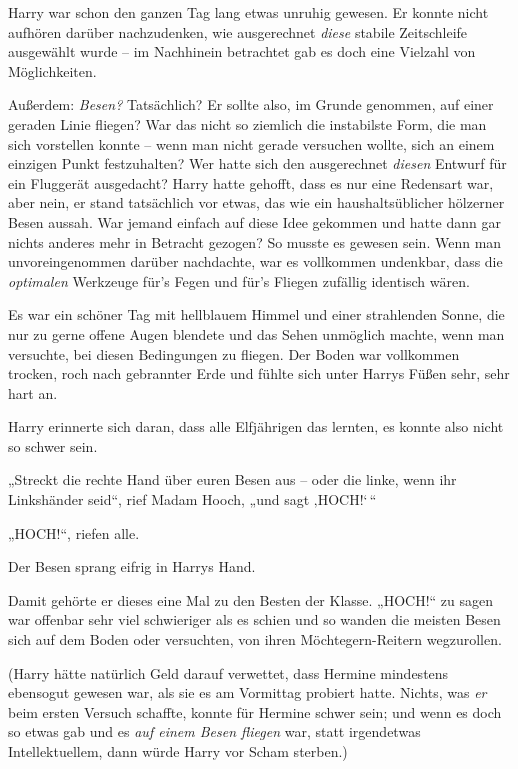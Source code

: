 {Harry war schon den ganzen Tag lang etwas unruhig gewesen. Er konnte nicht aufhören darüber nachzudenken, wie ausgerechnet \emph{diese} stabile Zeitschleife ausgewählt wurde -- im Nachhinein betrachtet gab es doch eine Vielzahl von Möglichkeiten.

Außerdem: \emph{Besen?} Tatsächlich? Er sollte also, im Grunde genommen, auf einer geraden Linie fliegen? War das nicht so ziemlich die instabilste Form, die man sich vorstellen konnte -- wenn man nicht gerade versuchen wollte, sich an einem einzigen Punkt festzuhalten? Wer hatte sich den ausgerechnet \emph{diesen} Entwurf für ein Fluggerät ausgedacht? Harry hatte gehofft, dass es nur eine Redensart war, aber nein, er stand tatsächlich vor etwas, das wie ein haushaltsüblicher hölzerner Besen aussah. War jemand einfach auf diese Idee gekommen und hatte dann gar nichts anderes mehr in Betracht gezogen? So musste es gewesen sein. Wenn man unvoreingenommen darüber nachdachte, war es vollkommen undenkbar, dass die \emph{optimalen} Werkzeuge für's Fegen und für's Fliegen zufällig identisch wären.

Es war ein schöner Tag mit hellblauem Himmel und einer strahlenden Sonne, die nur zu gerne offene Augen blendete und das Sehen unmöglich machte, wenn man versuchte, bei diesen Bedingungen zu fliegen. Der Boden war vollkommen trocken, roch nach gebrannter Erde und fühlte sich unter Harrys Füßen sehr, sehr hart an.

Harry erinnerte sich daran, dass alle Elfjährigen das lernten, es konnte also nicht so schwer sein.

„Streckt die rechte Hand über euren Besen aus -- oder die linke, wenn ihr Linkshänder seid“, rief Madam Hooch, „und sagt ‚HOCH!`\,“

„HOCH!“, riefen alle.

Der Besen sprang eifrig in Harrys Hand.

Damit gehörte er dieses eine Mal zu den Besten der Klasse. „HOCH!“ zu sagen war offenbar sehr viel schwieriger als es schien und so wanden die meisten Besen sich auf dem Boden oder versuchten, von ihren Möchtegern-Reitern wegzurollen.

(Harry hätte natürlich Geld darauf verwettet, dass Hermine mindestens ebensogut gewesen war, als sie es am Vormittag probiert hatte. Nichts, was \emph{er} beim ersten Versuch schaffte, konnte für Hermine schwer sein; und wenn es doch so etwas gab und es \emph{auf einem Besen fliegen} war, statt irgendetwas Intellektuellem, dann würde Harry vor Scham sterben.)

}
